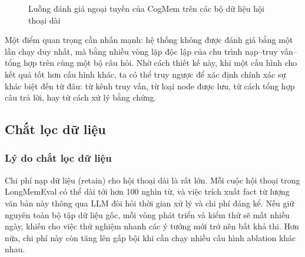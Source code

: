 \documentclass[../main.tex]{subfiles}
\begin{document}
\begin{figure}[H]
\centering
{}
\caption{Luồng đánh giá ngoại tuyến của CogMem trên các bộ dữ liệu hội thoại dài}
\label{fig:ch4_eval_flow}
\end{figure}

Một điểm quan trọng cần nhấn mạnh: hệ thống không được đánh giá bằng một lần chạy duy nhất, mà bằng nhiều vòng lặp độc lập của chu trình nạp--truy vấn--tổng hợp trên cùng một bộ câu hỏi. Nhờ cách thiết kế này, khi một cấu hình cho kết quả tốt hơn cấu hình khác, ta có thể truy ngược để xác định chính xác sự khác biệt đến từ đâu: từ kênh truy vấn, từ loại node được lưu, từ cách tổng hợp câu trả lời, hay từ cách xử lý bằng chứng.

\subsection{Chắt lọc dữ liệu}

\subsubsection{Lý do chắt lọc dữ liệu}

Chi phí nạp dữ liệu (retain) cho hội thoại dài là rất lớn. Mỗi cuộc hội thoại trong LongMemEval có thể dài tới hơn 100 nghìn từ, và việc trích xuất fact từ lượng văn bản này thông qua LLM đòi hỏi thời gian xử lý và chi phí đáng kể. Nếu giữ nguyên toàn bộ tập dữ liệu gốc, mỗi vòng phát triển và kiểm thử sẽ mất nhiều ngày, khiến cho việc thử nghiệm nhanh các ý tưởng mới trở nên bất khả thi. Hơn nữa, chi phí này còn tăng lên gấp bội khi cần chạy nhiều cấu hình ablation khác nhau.
\end{document}
